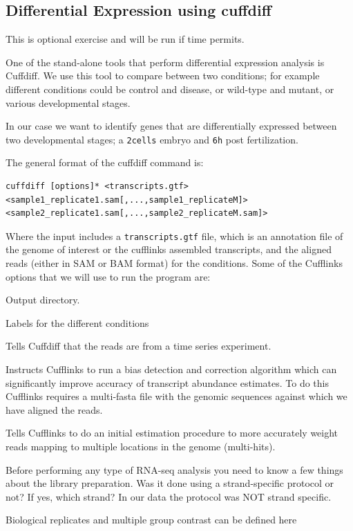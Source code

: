 \begin{bonus}

\section{Differential Expression using cuffdiff}

\begin{warning}
This is optional exercise and will be run if time permits. 
\end{warning}

One of the stand-alone tools that perform differential expression analysis is
Cuffdiff. We use this tool to compare between two conditions; for example
different conditions could be control and disease, or wild-type and mutant, or
various developmental stages.

In our case we want to identify genes that are differentially expressed between
two developmental stages; a \texttt{2cells} embryo and \texttt{6h} post
fertilization.

\begin{information}
The general format of the cuffdiff command is:

\begin{lstlisting}[style=command_syntax]
cuffdiff [options]* <transcripts.gtf> <sample1_replicate1.sam[,...,sample1_replicateM]> <sample2_replicate1.sam[,...,sample2_replicateM.sam]>
\end{lstlisting}

Where the input includes a \texttt{transcripts.gtf} file, which is an annotation
file of the genome of interest or the cufflinks assembled transcripts, and the aligned reads (either in SAM or BAM
format) for the conditions.
Some of the Cufflinks options that we will use to run the program are:

\begin{description}[style=multiline,labelindent=0cm,align=right,leftmargin=\descriptionlabelspace,rightmargin=1.5cm,font=\ttfamily]
  \item[-o] Output directory.
  \item[-L] Labels for the different conditions
  \item[-T] Tells Cuffdiff that the reads are from a time series experiment.
  \item[-b] Instructs Cufflinks to run a bias detection and correction algorithm
  which can significantly improve accuracy of transcript abundance estimates.
  To do this Cufflinks requires a multi-fasta file with the genomic sequences
  against which we have aligned the reads.
  \item[-u] Tells Cufflinks to do an initial estimation procedure to more
  accurately weight reads mapping to multiple locations in the genome
  (multi-hits). 
  \item[--library-type] Before performing any type of RNA-seq analysis you need
 to know a few things about the library preparation. Was it done using a
 strand-specific protocol or not? If yes, which strand? In our data the protocol
 was NOT strand specific.
  \item[-C] Biological replicates and multiple group contrast can be defined here 
\end{description}


\end{information}
\end{bonus}
